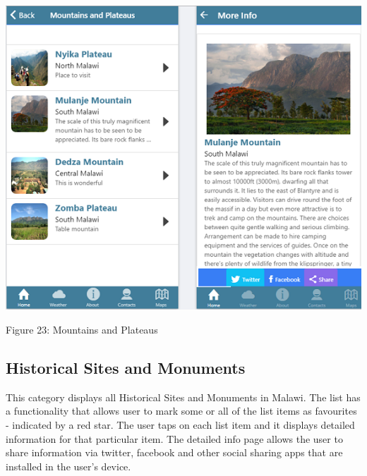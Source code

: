 \begin{center}    
	\includegraphics{img/mountains.png}
\end{center}
\begin{center}
	Figure 23: Mountains and Plateaus 
\end{center}
\paragraph{}

\subsection{Historical Sites and Monuments}
This category displays all Historical Sites and Monuments in Malawi. The list has a functionality that allows user to mark some or all of the list items as favourites - indicated by a red star. The user taps on each list item and it displays detailed information for that particular item. The detailed info page allows the user to share information via twitter, facebook and other social sharing apps that are installed in the user’s device.


